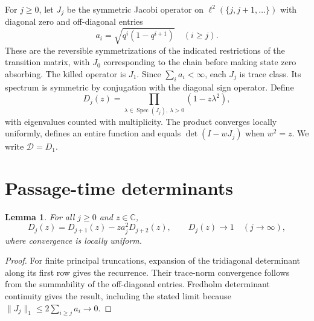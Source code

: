 \documentclass[11pt]{article}
\newtheorem{lemma}[theorem]{Lemma}
\theoremstyle{definition}\newtheorem{definition}[theorem]{Definition}
\begin{document}
For $j\geq0$, let $J_j$ be the symmetric Jacobi operator on $\ell^2(\{j,j+1,\ldots\})$ with diagonal zero and off-diagonal entries
\begin{equation}\label{eq:weights}
 a_i=\sqrt{q^i(1-q^{i+1})}\quad (i\geq j).
\end{equation}
These are the reversible symmetrizations of the indicated restrictions of the transition matrix, with $J_0$ corresponding to the chain before making state zero absorbing. The killed operator is $J_1$. Since $\sum_i a_i<\infty$, each $J_j$ is trace class. Its spectrum is symmetric by conjugation with the diagonal sign operator. Define
\begin{equation}\label{eq:det}
 D_j(z)=\prod_{\lambda\in\operatorname{Spec}(J_j),\ \lambda>0}(1-z\lambda^2),
\end{equation}
with eigenvalues counted with multiplicity. The product converges locally uniformly, defines an entire function and equals $\det(I-wJ_j)$ when $w^2=z$. We write $\mathcal D=D_1$.

\section{Passage-time determinants}
\begin{lemma}\label{lem:detrec}
For all $j\geq0$ and $z\in\mathbb C$,
\begin{equation}\label{eq:detrec}
 D_j(z)=D_{j+1}(z)-za_j^2D_{j+2}(z),\qquad
 D_j(z)\longrightarrow1\quad(j\to\infty),
\end{equation}
where convergence is locally uniform.
\end{lemma}
\begin{proof}
For finite principal truncations, expansion of the tridiagonal determinant along its first row gives the recurrence. Their trace-norm convergence follows from the summability of the off-diagonal entries. Fredholm determinant continuity gives the result, including the stated limit because $\|J_j\|_1\leq2\sum_{i\geq j}a_i\to0$.
\end{proof}
\end{document}
